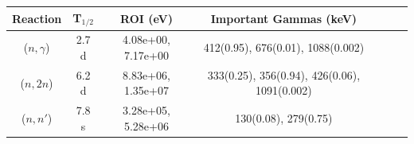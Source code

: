 \begin{figure}[!ht]
   \centering
   \quad
   \\ 
   \quad 
   \\ 

\end{figure}

\begin{table}[h]
\centering
\begin{tabular}{ |c|c|c|c|c|c|c| }
 \hline
 Reaction & T$_{1/2}$ & ROI (eV) & Important Gammas (keV) \\
 \hline 
 ($n,\gamma$) &  2.7 d & 4.08e+00, 7.17e+00 & 412(0.95), 676(0.01), 1088(0.002) \\ 
\hline
 ($n,2n$) &  6.2 d & 8.83e+06, 1.35e+07 & 333(0.25), 356(0.94), 426(0.06), 1091(0.002) \\ 
\hline
 ($n,n'$) &  7.8 s & 3.28e+05, 5.28e+06 & 130(0.08), 279(0.75) \\ 
\hline
\end{tabular}
\end{table}
